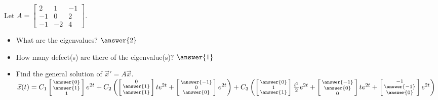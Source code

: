 \documentclass{ximera}
\begin{document}
\begin{exercise}
    Let $A = 
    \left[ 
        \begin{smallmatrix}
            2 & 1 & -1 \\
            -1 & 0 & 2 \\
            -1 & -2 & 4
        \end{smallmatrix} 
    \right]$.
    \begin{itemize}
        \item What are the eigenvalues? $\answer{2}$
        \item How many defect(s) are there of the eigenvalue(s)? $\answer{1}$
        \item Find the general solution of ${\vec{x}}' = A \vec{x}$.\\
            $\vec{x}(t) = C_1 \left[\begin{smallmatrix} \answer{0} \\ \answer{1} \\ 1 \end{smallmatrix}\right]e^{2t} + C_2\left(\left[\begin{smallmatrix} 0 \\ \answer{1} \\ \answer{1} \end{smallmatrix}\right]te^{2t} + \left[\begin{smallmatrix} \answer{-1} \\ 0 \\ \answer{0} \end{smallmatrix}\right]e^{2t}\right) + C_3\left(\left[\begin{smallmatrix} \answer{0} \\1 \\ \answer{1} \end{smallmatrix}\right]\frac{t^2}{2}e^{2t} + \left[\begin{smallmatrix} \answer{-1} \\ \answer{0} \\ 0 \end{smallmatrix}\right]te^{2t} + \left[\begin{smallmatrix} -1 \\ \answer{-1} \\ \answer{0} \end{smallmatrix}\right]e^{2t}\right)$
    \end{itemize}
\end{exercise}
\end{document}

